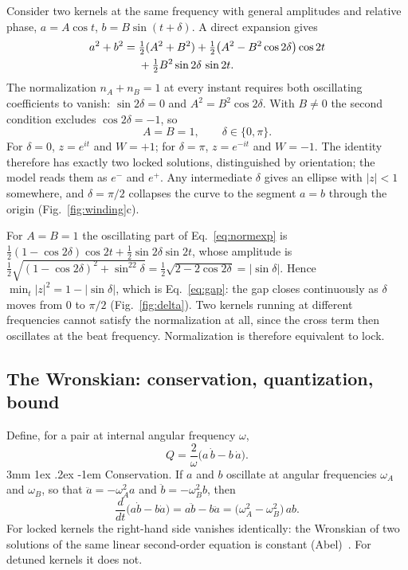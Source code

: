 \documentclass[%
 reprint, amsmath,amssymb, aps, prb, ]{revtex4-2}
\makeatletter
\numberwithin{equation}{section}
\renewcommand\paragraph{%
  \@startsection{paragraph}{4}{\z@}%
    {3mm \@plus 1ex \@minus .2ex}%
    {-1em}%
    {\normalfont\normalsize\itshape}}
\makeatother
\begin{document}
Consider two kernels at the same frequency with general amplitudes and relative phase, $a=A\cos t$, $b=B\sin(t+\delta)$. A direct expansion gives
\begin{align}
a^2+b^2={}&\tfrac12(A^2+B^2)+\tfrac12\big(A^2-B^2\cos2\delta\big)\cos2t
\notag\\
&+\tfrac12B^2\sin2\delta\,\sin2t .
\label{eq:normexp}
\end{align}
The normalization $n_A+n_B=1$ at every instant requires both oscillating coefficients to vanish: $\sin2\delta=0$ and $A^2=B^2\cos2\delta$. With $B\neq0$ the second condition excludes $\cos2\delta=-1$, so
\begin{equation}
A=B=1,\qquad \delta\in\{0,\pi\}.
\label{eq:twosol}
\end{equation}
For $\delta=0$, $z=e^{it}$ and $W=+1$; for $\delta=\pi$, $z=e^{-it}$ and $W=-1$. The identity therefore has exactly two locked solutions, distinguished by orientation; the model reads them as $e^{-}$ and $e^{+}$. Any intermediate $\delta$ gives an ellipse with $|z|<1$ somewhere, and $\delta=\pi/2$ collapses the curve to the segment $a=b$ through the origin (Fig.~\ref{fig:winding}c).

For $A=B=1$ the oscillating part of Eq.~\eqref{eq:normexp} is $\tfrac12(1-\cos2\delta)\cos2t+\tfrac12\sin2\delta\sin2t$, whose amplitude is $\tfrac12\sqrt{(1-\cos2\delta)^2+\sin^22\delta}=\tfrac12\sqrt{2-2\cos2\delta}=|\sin\delta|$. Hence $\min_t|z|^2=1-|\sin\delta|$, which is Eq.~\eqref{eq:gap}: the gap closes continuously as $\delta$ moves from $0$ to $\pi/2$ (Fig.~\ref{fig:delta}). Two kernels running at different frequencies cannot satisfy the normalization at all, since the cross term then oscillates at the beat frequency. Normalization is therefore equivalent to lock.

\subsection{The Wronskian: conservation, quantization, bound}

Define, for a pair at internal angular frequency $\omega$,
\begin{equation}
Q=\frac{2}{\omega}\big(a\,\dot b-b\,\dot a\big).
\label{eq:Qapp}
\end{equation}
\paragraph{Conservation.} If $a$ and $b$ oscillate at angular frequencies $\omega_A$ and $\omega_B$, so that $\ddot a=-\omega_A^2a$ and $\ddot b=-\omega_B^2b$, then
\begin{equation}
\frac{d}{dt}\big(a\dot b-b\dot a\big)=a\ddot b-b\ddot a=\big(\omega_A^2-\omega_B^2\big)\,ab .
\label{eq:dQ}
\end{equation}
For locked kernels the right-hand side vanishes identically: the Wronskian of two solutions of the same linear second-order equation is constant (Abel)~\cite{ref:coddington}. For detuned kernels it does not.
\end{document}
